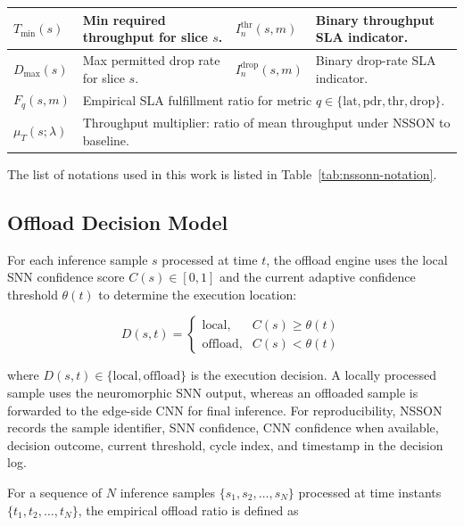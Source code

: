\documentclass[journal]{IEEEtran}
\newcommand{\revblue}[1]{\textcolor{revblue}{#1}}
\begin{document}
\begin{table}[!t]
\begin{tabular}{|p{1.8cm}|p{5.7cm}|p{1.8cm}|p{5.7cm}|}
\hline
\revblue{$T_{\min}(s)$} & \revblue{Min required throughput for slice $s$.} &
\revblue{$I^{\mathrm{thr}}_n(s,m)$} & \revblue{Binary throughput SLA indicator.} \\
\hline
\revblue{$D_{\max}(s)$} & \revblue{Max permitted drop rate for slice $s$.} &
\revblue{$I^{\mathrm{drop}}_n(s,m)$} & \revblue{Binary drop-rate SLA indicator.} \\
\hline
\revblue{$F_q(s,m)$} & \multicolumn{3}{p{13.5cm}|}{\revblue{Empirical SLA fulfillment ratio for metric $q\in\{\mathrm{lat},\mathrm{pdr},\mathrm{thr},\mathrm{drop}\}$.}} \\
\hline
\revblue{$\mu_T(s;\lambda)$} & \multicolumn{3}{p{13.5cm}|}{\revblue{Throughput multiplier: ratio of mean throughput under NSSON to baseline.}} \\
\hline
\end{tabular}
\end{table}
The list of notations used in this work is listed in Table~\ref{tab:nssonn-notation}.



\subsection{Offload Decision Model}
\label{sec:model}

For each inference sample $s$ processed at time $t$, the offload engine
uses the local SNN confidence score $C(s)\in[0,1]$ and the current
adaptive confidence threshold $\theta(t)$ to determine the execution
location:

\begin{equation}
D(s,t) =
\begin{cases}
\text{local}, & C(s) \geq \theta(t) \\
\text{offload}, & C(s) < \theta(t)
\end{cases}
\label{eq:decision}
\end{equation}

where $D(s,t)\in\{\text{local},\text{offload}\}$ is the execution
decision. A locally processed sample uses the neuromorphic SNN output,
whereas an offloaded sample is forwarded to the edge-side CNN for final
inference. For reproducibility, NSSON records the sample identifier, SNN
confidence, CNN confidence when available, decision outcome, current
threshold, cycle index, and timestamp in the decision log.

For a sequence of $N$ inference samples
$\{s_1,s_2,\dots,s_N\}$ processed at time instants
$\{t_1,t_2,\dots,t_N\}$, the empirical offload ratio is defined as
\end{document}
